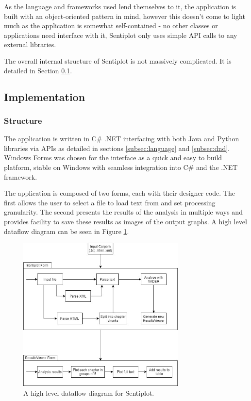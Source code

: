 \documentclass{article}
\begin{document}
{        As the language and frameworks used lend themselves to it, the application is built with an object-oriented pattern in mind, however this doesn't come to light much as the application is somewhat self-contained - no other classes or applications need interface with it, Sentiplot only uses simple API calls to any external libraries.

        The overall internal structure of Sentiplot is not massively complicated. It is detailed in Section \ref{subsec:implementation}.
    \subsection{Implementation}
    \label{subsec:implementation}
        \subsubsection{Structure}
            The application is written in C\# .NET interfacing with both Java and Python libraries via APIs as detailed in sections \ref{subsec:language} and \ref{subsec:dnd}. Windows Forms was chosen for the interface as a quick and easy to build platform, stable on Windows with seamless integration into C\# and the .NET framework.

            The application is composed of two forms, each with their designer code. The first allows the user to select a file to load text from and set processing granularity. The second presents the results of the analysis in multiple ways and provides facility to save these results as images of the output graphs. A high level dataflow diagram can be seen in Figure \ref{fig:dataflow}.
            \begin{figure}
                \centering
                \includegraphics[width=0.75\textwidth]{Figures/Misc/Dataflow Diagram}
                \caption{A high level dataflow diagram for Sentiplot.}
                \label{fig:dataflow}
            \end{figure}
}
\end{document}
